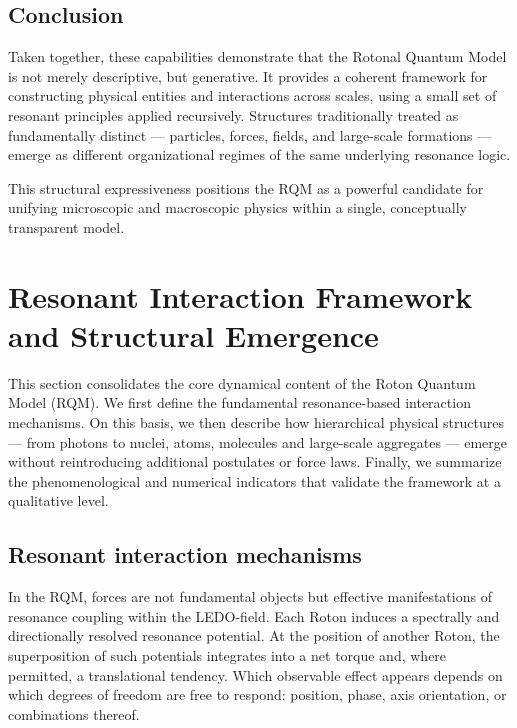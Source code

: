 \documentclass[11pt,a4paper]{article}
\begin{document}
\subsection{Conclusion}

Taken together, these capabilities demonstrate that the Rotonal Quantum Model is not merely descriptive, but generative. It provides a coherent framework for constructing physical entities and interactions across scales, using a small set of resonant principles applied recursively. Structures traditionally treated as fundamentally distinct --- particles, forces, fields, and large-scale formations --- emerge as different organizational regimes of the same underlying resonance logic.

This structural expressiveness positions the RQM as a powerful candidate for unifying microscopic and macroscopic physics within a single, conceptually transparent model.









\section{Resonant Interaction Framework and Structural Emergence}
\label{sec:resonant_framework}

This section consolidates the core dynamical content of the Roton Quantum Model (RQM).
We first define the fundamental resonance-based interaction mechanisms.
On this basis, we then describe how hierarchical physical structures --- from photons
to nuclei, atoms, molecules and large-scale aggregates --- emerge without reintroducing
additional postulates or force laws.
Finally, we summarize the phenomenological and numerical indicators that validate the
framework at a qualitative level.

\subsection{Resonant interaction mechanisms}

In the RQM, forces are not fundamental objects but effective manifestations of resonance
coupling within the LEDO-field. Each Roton induces a spectrally and directionally resolved
resonance potential. At the position of another Roton, the superposition of such potentials
integrates into a net torque and, where permitted, a translational tendency. Which observable
effect appears depends on which degrees of freedom are free to respond: position, phase,
axis orientation, or combinations thereof.
\end{document}
